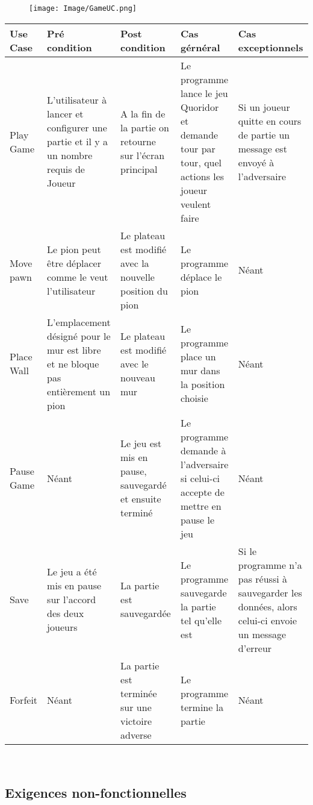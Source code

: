\documentclass[french, utf8]{article}
\begin{document}
\begin{figure}[ht]
     \centering
    \texttt{[image: Image/GameUC.png]}

\end{figure}
\begin{center}
\begin{tabular}{|m{3cm}|m{3cm}|m{3cm}|m{3cm}|m{3cm}|}
\hline  Use Case & Pré condition      &  Post condition  & Cas gérnéral & Cas exceptionnels\\
\hline Play Game& L'utilisateur à lancer et configurer une partie et il y a un nombre requis de Joueur & A la fin de la partie on retourne sur l'écran principal & Le programme lance le jeu Quoridor et demande tour par tour, quel actions les joueur veulent faire & Si un joueur quitte en cours de partie un message est envoyé à l'adversaire  \\
\hline Move pawn  & Le pion peut être déplacer comme le veut l'utilisateur & Le plateau est modifié avec la nouvelle position du pion & Le programme déplace le pion & Néant \\
\hline Place Wall  & L'emplacement désigné pour le mur est libre et ne bloque pas entièrement un pion & Le plateau est modifié avec le nouveau mur & Le programme place un mur dans la position choisie & Néant \\
\hline Pause Game  & Néant & Le jeu est mis en pause, sauvegardé et ensuite terminé & Le programme demande à l'adversaire si celui-ci accepte de mettre en pause le jeu & Néant \\
\hline Save  & Le jeu a été mis en pause sur l'accord des deux joueurs & La partie est sauvegardée & Le programme sauvegarde la partie tel qu'elle est & Si le programme n'a pas réussi à sauvegarder les données, alors celui-ci envoie un message d'erreur \\
\hline Forfeit  & Néant & La partie est terminée sur une victoire adverse & Le programme termine la partie & Néant \\
\hline
\end{tabular}\\
\end{center}
\newpage
\subsection{Exigences non-fonctionnelles}
\end{document}
